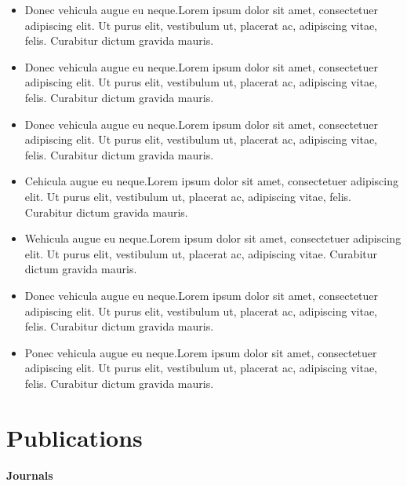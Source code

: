 \documentclass{article}
\begin{document}
\begin{itemize}
    \item Donec vehicula augue eu neque.Lorem ipsum dolor sit amet, consectetuer adipiscing elit. Ut purus elit, vestibulum ut, placerat ac,
    adipiscing vitae, felis. Curabitur dictum gravida mauris. 
    
    \item Donec vehicula augue eu neque.Lorem ipsum dolor sit amet, consectetuer adipiscing elit. Ut purus elit, vestibulum ut, placerat ac,
    adipiscing vitae, felis. Curabitur dictum gravida mauris.
    
    \item Donec vehicula augue eu neque.Lorem ipsum dolor sit amet, consectetuer adipiscing elit. Ut purus elit, vestibulum ut, placerat ac,
    adipiscing vitae, felis. Curabitur dictum gravida mauris.
    
    \item Cehicula augue eu neque.Lorem ipsum dolor sit amet, consectetuer adipiscing elit. Ut purus elit, vestibulum ut, placerat ac,
    adipiscing vitae, felis. Curabitur dictum gravida mauris. 
    
     \item Wehicula augue eu neque.Lorem ipsum dolor sit amet, consectetuer adipiscing elit. Ut purus elit, vestibulum ut, placerat ac, adipiscing vitae. Curabitur dictum gravida mauris.
    
    \item Donec vehicula augue eu neque.Lorem ipsum dolor sit amet, consectetuer adipiscing elit. Ut purus elit, vestibulum ut, placerat ac,
    adipiscing vitae, felis. Curabitur dictum gravida mauris. 
    
    
    \item Ponec vehicula augue eu neque.Lorem ipsum dolor sit amet, consectetuer adipiscing elit. Ut purus elit, vestibulum ut, placerat ac,
    adipiscing vitae, felis. Curabitur dictum gravida mauris.
\end{itemize}




\section{Publications}
 
\hspace{0.45cm}\textbf{Journals}
\end{document}
